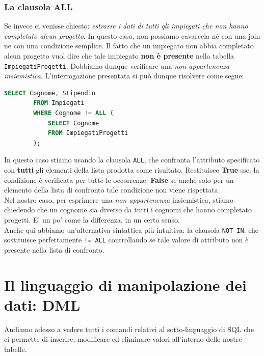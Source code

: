 \documentclass[12pt]{report}
\begin{document}
	\subsubsection*{La clausola ALL}
	Se invece ci venisse chiesto: \textit{estrarre i dati di tutti gli impiegati che non hanno completato alcun progetto}. In questo caso, non possiamo cavarcela né con una join ne con una condizione semplice. Il fatto che un impiegato non abbia completato alcun progetto vuol dire che tale impiegato \textbf{non è presente} nella tabella \texttt{ImpiegatiProgetti}. Dobbiamo dunque verificare una \textit{non appartenenza insiemistica}. L'interrogazione presentata si può dunque risolvere come segue:
	\begin{lstlisting}[language=SQL]
		SELECT Cognome, Stipendio
		FROM Impiegati
		WHERE Cognome != ALL (
			SELECT Cognome
			FROM ImpiegatiProgetti
		);
	\end{lstlisting}
	In questo caso stiamo usando la clausola \texttt{ALL}, che confronta l'attributo specificato con \textbf{tutti} gli elementi della lista prodotta come risultato. Restituisce \textbf{True} sse. la condizione è verificata per tutte le occorrenze; \textbf{False} se anche solo per un elemento della lista di confronto tale condizione non viene rispettata.\\
	Nel nostro caso, per esprimere una \textit{non appartenenza} insiemistica, stiamo chiedendo che un cognome sia diverso da tutti i cognomi che hanno completato progetti. E' un po' come la differenza, in un certo senso.\\
	Anche qui abbiamo un'alternativa sintattica più intuitiva: la clausola \texttt{NOT IN}, che sostituisce perfettamente \texttt{!= ALL} controllando se tale valore di attributo non è presente nella lista di confronto.
	
	\section{Il linguaggio di manipolazione dei dati: DML}
	Andiamo adesso a vedere tutti i comandi relativi al sotto-linguaggio di SQL che ci permette di inserire, modificare ed eliminare valori all'interno delle nostre tabelle.
	
\end{document}
